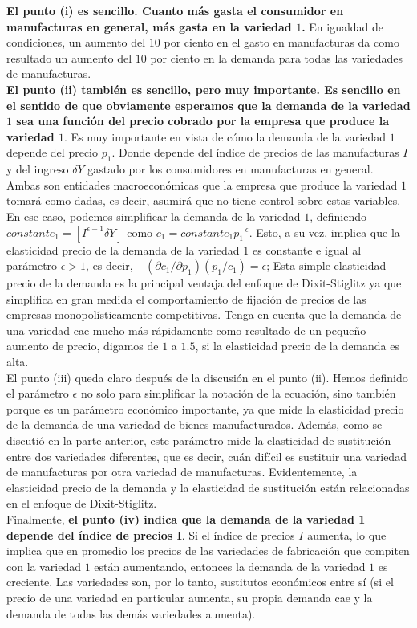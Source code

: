 \textbf{El punto (i) es sencillo. Cuanto más gasta el consumidor en manufacturas en general, más gasta en la variedad $1$.} En igualdad de condiciones, un aumento del $10$ por ciento en el gasto en manufacturas da como resultado un aumento del $10$ por ciento en la demanda para todas las variedades de manufacturas.\\
\textbf{El punto (ii) también es sencillo, pero muy importante. Es sencillo en el sentido de que obviamente esperamos que la demanda de la variedad $1$ sea una función del precio cobrado por la empresa que produce la variedad $1$}. Es muy importante en vista de cómo la demanda de la variedad $1$ depende del precio $p_1$. Donde depende del índice de precios de las manufacturas $I$ y del ingreso $\delta Y$ gastado por los consumidores en manufacturas en general. Ambas son entidades macroeconómicas que la empresa que produce la variedad $1$ tomará como dadas, es decir, asumirá que no tiene control sobre estas variables. En ese caso, podemos simplificar la demanda de la variedad $1$, definiendo $constante_1 = [I^{\epsilon-1} \delta Y]$ como $c_1 = constante_1 p_1^{-\epsilon}$. Esto, a su vez, implica que la elasticidad precio de la demanda de la variedad $1$ es constante e igual al parámetro $\epsilon > 1$, es decir, $-(\partial c_1/\partial p_1)(p_1/c_1) =\epsilon$;  Esta simple elasticidad precio de la demanda es la principal ventaja del enfoque de Dixit-Stiglitz ya que simplifica en gran medida el comportamiento de fijación de precios de las empresas monopolísticamente competitivas. Tenga en cuenta que la demanda de una variedad cae mucho más rápidamente como resultado de un pequeño aumento de precio, digamos de $1$ a $1.5$, si la elasticidad precio de la demanda es alta.\\
El punto (iii) queda claro después de la discusión en el punto (ii). Hemos definido el parámetro $\epsilon$ no solo para simplificar la notación de la ecuación, sino también porque es un parámetro económico importante, ya que mide la elasticidad precio de la demanda de una variedad de bienes manufacturados. Además, como se discutió en la parte anterior, este parámetro mide la elasticidad de sustitución entre dos variedades diferentes, que es decir, cuán difícil es sustituir una variedad de manufacturas por otra variedad de manufacturas. Evidentemente, la elasticidad precio de la demanda y la elasticidad de sustitución están relacionadas en el enfoque de Dixit-Stiglitz.\\
Finalmente, \textbf{el punto (iv) indica que la demanda de la variedad 1 depende del índice de precios I}. Si el índice de precios $I$ aumenta, lo que implica que en promedio los precios de las variedades de fabricación que compiten con la variedad $1$ están aumentando, entonces la demanda de la variedad $1$ es creciente. Las variedades son, por lo tanto, sustitutos económicos entre sí (si el precio de una variedad en particular aumenta, su propia demanda cae y la demanda de todas las demás variedades aumenta).\\


